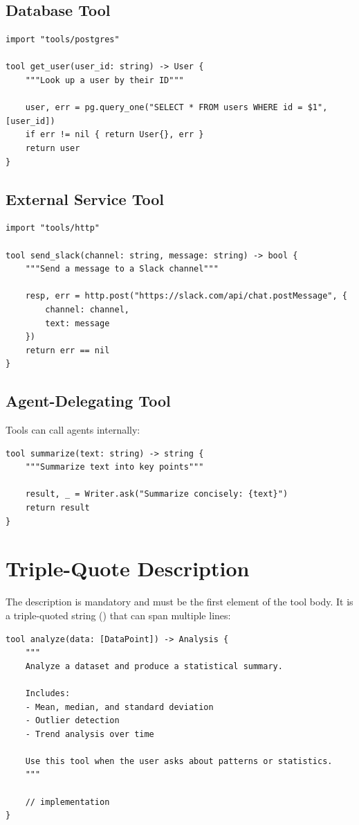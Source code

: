 \subsection{Database Tool}

\begin{lstlisting}
import "tools/postgres"

tool get_user(user_id: string) -> User {
    """Look up a user by their ID"""

    user, err = pg.query_one("SELECT * FROM users WHERE id = $1", [user_id])
    if err != nil { return User{}, err }
    return user
}
\end{lstlisting}

\subsection{External Service Tool}

\begin{lstlisting}
import "tools/http"

tool send_slack(channel: string, message: string) -> bool {
    """Send a message to a Slack channel"""

    resp, err = http.post("https://slack.com/api/chat.postMessage", {
        channel: channel,
        text: message
    })
    return err == nil
}
\end{lstlisting}

\subsection{Agent-Delegating Tool}

Tools can call agents internally:

\begin{lstlisting}
tool summarize(text: string) -> string {
    """Summarize text into key points"""

    result, _ = Writer.ask("Summarize concisely: {text}")
    return result
}
\end{lstlisting}

\section{Triple-Quote Description}

The description is mandatory and must be the first element of the tool body. It is a triple-quoted string () that can span multiple lines:

\begin{lstlisting}
tool analyze(data: [DataPoint]) -> Analysis {
    """
    Analyze a dataset and produce a statistical summary.

    Includes:
    - Mean, median, and standard deviation
    - Outlier detection
    - Trend analysis over time

    Use this tool when the user asks about patterns or statistics.
    """

    // implementation
}
\end{lstlisting}

